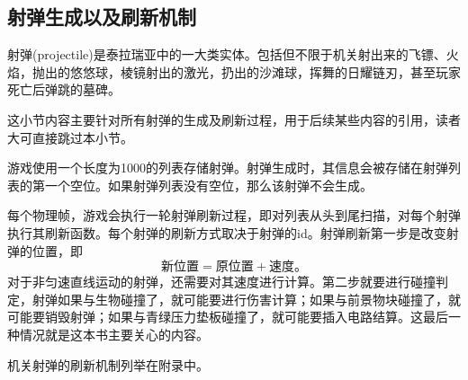 \subsection{射弹生成以及刷新机制}
射弹(projectile)是泰拉瑞亚中的一大类实体。包括但不限于机关射出来的飞镖、火焰，抛出的悠悠球，棱镜射出的激光，扔出的沙滩球，挥舞的日耀链刃，甚至玩家死亡后弹跳的墓碑。

这小节内容主要针对所有射弹的生成及刷新过程，用于后续某些内容的引用，读者大可直接跳过本小节。

游戏使用一个长度为1000的列表存储射弹。射弹生成时，其信息会被存储在射弹列表的第一个空位。如果射弹列表没有空位，那么该射弹不会生成。

每个物理帧，游戏会执行一轮射弹刷新过程，即对列表从头到尾扫描，对每个射弹执行其刷新函数。每个射弹的刷新方式取决于射弹的id。射弹刷新第一步是改变射弹的位置，即$$\textrm{新位置}=\textrm{原位置}+\textrm{速度。}$$对于非匀速直线运动的射弹，还需要对其速度进行计算。第二步就要进行碰撞判定，射弹如果与生物碰撞了，就可能要进行伤害计算；如果与前景物块碰撞了，就可能要销毁射弹；如果与青绿压力垫板碰撞了，就可能要插入电路结算。这最后一种情况就是这本书主要关心的内容。

机关射弹的刷新机制列举在附录中。